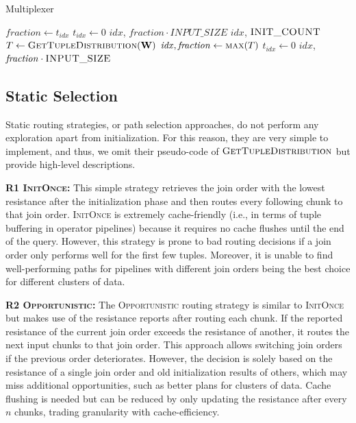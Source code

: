 \begin{algorithm}[!t]
\caption{Multiplexer}\label{alg:multiplexer}
\begin{algorithmic}[1]
    \State $\mathit{fraction} \gets t_{\mathit{idx}}$ 
    \State $t_{\mathit{idx}} \gets 0$
    \State\Return $\mathit{idx}$, $\mathit{fraction} \cdot \mathit{INPUT\_SIZE}$
 
    \State\Return $\mathit{idx}$, $\textsc{INIT\_COUNT}$
\EndIf
\State $T \gets \textsc{GetTupleDistribution}(\mathbf{W})$
\State $\mathit{idx}, \mathit{fraction} \gets \textsc{max}(T)$
\State $t_{\mathit{idx}} \gets 0$
\State\Return $\mathit{idx}$, $\mathit{fraction} \cdot \textsc{INPUT\_SIZE}$
\end{algorithmic}
\end{algorithm}

\subsection{Static Selection}

Static routing strategies, or path selection approaches, do not perform any exploration apart from initialization. For this reason, they are very simple to implement, and thus, we omit their pseudo-code of $\textsc{GetTupleDistribution}$ but provide high-level descriptions.

\textbf{R1 \textsc{InitOnce}:} This simple strategy retrieves the join order with the lowest resistance after the initialization phase and then routes every following chunk to that join order. \textsc{InitOnce} is extremely cache-friendly (i.e., in terms of tuple buffering in operator pipelines) because it requires no cache flushes until the end of the query. However, this strategy is prone to bad routing decisions if a join order only performs well for the first few tuples. Moreover, it is unable to find well-performing paths for pipelines with different join orders being the best choice for different clusters of data.

\textbf{R2 \textsc{Opportunistic}:} The \textsc{Opportunistic} routing strategy is similar to \textsc{InitOnce} but makes use of the resistance reports after routing each chunk. If the reported resistance of the current join order exceeds the resistance of another, it routes the next input chunks to that join order. This approach allows switching join orders if the previous order deteriorates. However, the decision is solely based on the resistance of a single join order and old initialization results of others, which may miss additional opportunities, such as better plans for clusters of data. Cache flushing is needed but can be reduced by only updating the resistance after every $n$ chunks, trading granularity with cache-efficiency.  

